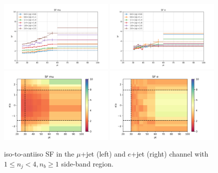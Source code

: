 \begin{figure}
    \centering
    \includegraphics[width=0.49\textwidth]{chapters/Appendix/sectionQCD/figures/123j1b/SF_mu_1d.png}
    \includegraphics[width=0.49\textwidth]{chapters/Appendix/sectionQCD/figures/123j1b/SF_e_1d.png}
    \includegraphics[width=0.49\textwidth]{chapters/Appendix/sectionQCD/figures/123j1b/SF_mu_2d.png}
    \includegraphics[width=0.49\textwidth]{chapters/Appendix/sectionQCD/figures/123j1b/SF_e_2d.png}

    \caption{iso-to-antiiso SF in the $\mu$+jet (left) and $e$+jet (right) channel 
    with $1\leq n_j <4, n_b\geq1$ side-band region.}
    \label{fig:appendix:123j1b_sf}
\end{figure}



